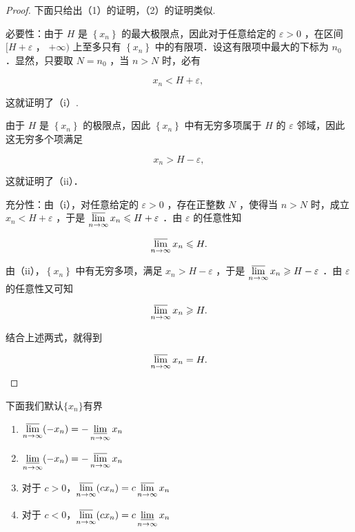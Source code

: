 \begin{proof}
	下面只给出（1）的证明，（2）的证明类似.
	
	必要性：由于 $H$ 是 $\left\{x_n\right\}$ 的最大极限点，因此对于任意给定的 $\varepsilon>0$ ，在区间 $[H+\varepsilon$ ， $+\infty)$ 上至多只有 $\left\{x_n\right\}$ 中的有限项．设这有限项中最大的下标为 $n_0$ ．显然，只要取 $N=n_0$ ，当 $n>N$ 时，必有
	
	$$
	x_n<H+\varepsilon \text {, }
	$$
	
	
	这就证明了（i）.
	
	
	由于 $H$ 是 $\left\{x_n\right\}$ 的极限点，因此 $\left\{x_n\right\}$ 中有无穷多项属于 $H$ 的 $\varepsilon$ 邻域，因此这无穷多个项满足
	
	$$
	x_n>H-\varepsilon,
	$$
	
	
	这就证明了（ii）．
	
	充分性：由（i），对任意给定的 $\varepsilon>0$ ，存在正整数 $N$ ，使得当 $n>N$ 时，成立 $x_n<H+\varepsilon$ ，于是 $\varlimsup\limits_{n \rightarrow \infty} x_n \leqslant H+\varepsilon$ ．由 $\varepsilon$ 的任意性知
	
	$$
	\varlimsup\limits_{n \rightarrow \infty} x_n \leqslant H .
	$$
	
	
	由（ii），$\left\{x_n\right\}$ 中有无穷多项，满足 $x_n>H-\varepsilon$ ，于是 $\varlimsup\limits_{n \rightarrow \infty} x_n \geqslant H-\varepsilon$ ．由 $\varepsilon$ 的任意性又可知
	
	$$
	\varlimsup\limits_{n \rightarrow \infty} x_n \geqslant H .
	$$
	
	
	结合上述两式，就得到
	
	$$
	\varlimsup_{n \rightarrow \infty} x_n=H .
	$$
	
	
	
\end{proof}
下面我们默认$\{x_n\}$有界
\begin{proposition}
	\begin{enumerate}
		\item  $\varlimsup\limits_{n \to \infty} (-x_n) = -\varliminf\limits_{n \to \infty} x_n$
		\item  $\varliminf\limits_{n \to \infty} (-x_n) = -\varlimsup\limits_{n \to \infty} x_n$
		\item 对于 $c > 0$，$\varlimsup\limits_{n \to \infty} (cx_n) = c \varlimsup\limits_{n \to \infty} x_n$
		\item 对于 $c < 0$，$\varlimsup\limits_{n \to \infty} (cx_n) = c \varliminf\limits_{n \to \infty} x_n$
		
	\end{enumerate}
\end{proposition}
